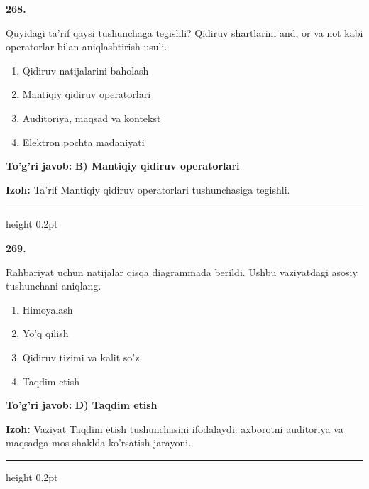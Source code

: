 \documentclass[10pt,a4paper,oneside]{article}
\begin{document}
\noindent\textbf{\color{ink}268.}
\par
Quyidagi ta'rif qaysi tushunchaga tegishli? Qidiruv shartlarini and, or va not kabi operatorlar bilan aniqlashtirish usuli.
\begin{enumerate}[label=\Alph*),leftmargin=9mm]
\item Qidiruv natijalarini baholash
\item Mantiqiy qidiruv operatorlari
\item Auditoriya, maqsad va kontekst
\item Elektron pochta madaniyati
\end{enumerate}
\begin{tcolorbox}[enhanced,breakable,colback=teal!4,colframe=teal!50!black,boxrule=0.5pt,arc=1.1mm,left=3mm,right=3mm,top=1.7mm,bottom=1.7mm,before skip=2mm,after skip=2mm]
\textbf{\color{teal}To'g'ri javob:} \textbf{B) Mantiqiy qidiruv operatorlari}
\par\smallskip
\textbf{Izoh:} Ta'rif Mantiqiy qidiruv operatorlari tushunchasiga tegishli.
\end{tcolorbox}
\vspace{2mm}\hrule height 0.2pt \vspace{3mm}

\noindent\textbf{\color{ink}269.}
\par
Rahbariyat uchun natijalar qisqa diagrammada berildi. Ushbu vaziyatdagi asosiy tushunchani aniqlang.
\begin{enumerate}[label=\Alph*),leftmargin=9mm]
\item Himoyalash
\item Yo'q qilish
\item Qidiruv tizimi va kalit so'z
\item Taqdim etish
\end{enumerate}
\begin{tcolorbox}[enhanced,breakable,colback=teal!4,colframe=teal!50!black,boxrule=0.5pt,arc=1.1mm,left=3mm,right=3mm,top=1.7mm,bottom=1.7mm,before skip=2mm,after skip=2mm]
\textbf{\color{teal}To'g'ri javob:} \textbf{D) Taqdim etish}
\par\smallskip
\textbf{Izoh:} Vaziyat Taqdim etish tushunchasini ifodalaydi: axborotni auditoriya va maqsadga mos shaklda ko'rsatish jarayoni.
\end{tcolorbox}
\vspace{2mm}\hrule height 0.2pt \vspace{3mm}
\end{document}
